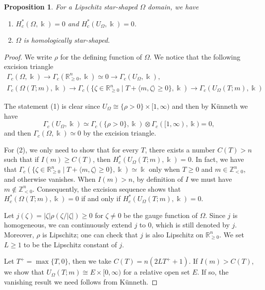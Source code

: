 \documentclass[11pt]{amsart}
\numberwithin{equation}{section}
\theoremstyle{plain}
\newtheorem{Prop}[prop]{Proposition}
\theoremstyle{definition}
\theoremstyle{remark}
\newcommand{\bZ} { {\mathbb{Z}}}
\newcommand{\bR} { {\mathbb{R}}}
\begin{document}
\begin{Prop}\label{proposition: regularity for lipschitz star-shaped domain}For a Lipschitz star-shaped $\Omega$ domain, we have
\begin{enumerate}
    \item $H_c^*(\Omega,\Bbbk)=0$ and $H_c^*(U_\Omega,\Bbbk)=0$.
    \item $\Omega$ is homologically star-shaped.
\end{enumerate}    
\end{Prop}
\begin{proof}We write $\rho$ for the defining function of $\Omega$. 
We notice that the following excision triangle
\begin{gather*}
    \Gamma_c(\Omega,\Bbbk)\to \Gamma_c(\bR^n_{\geq0},\Bbbk)\simeq 0\to \Gamma_c(U_\Omega,\Bbbk),\\ \Gamma_c(\Omega(T;m),\Bbbk)\to \Gamma_c(\{\zeta\in\bR^n_{\geq0} \mid T+\langle m,\zeta\rangle\geq 0\},\Bbbk)\to \Gamma_c(U_\Omega(T;m),\Bbbk)
\end{gather*}

The statement (1) is clear since $U_\Omega\cong \{\rho>0\}\times [1,\infty)$ and then by Künneth we have \[\Gamma_c(U_\Omega,\Bbbk)\simeq \Gamma_c(\{\rho>0\},\Bbbk)\otimes \Gamma_c([1,\infty),\Bbbk)=0,\]
and then $\Gamma_c(\Omega,\Bbbk)\simeq 0$ by the excision triangle.



For (2), we only need to show that for every $T$, there exists a number $C(T)>n$ such that if $I(m)\geq C(T)$, then $H^*_c(U_\Omega(T;m),\Bbbk)=0$. In fact, we have that $\Gamma_c(\{\zeta\in\bR^n_{\geq0} \mid T+\langle m,\zeta\rangle\geq 0\},\Bbbk)\simeq \Bbbk$ only when $T\geq 0$ and $m\in \bZ^n_{<0}$, and otherwise vanishes. When $I(m)>n$, by definition of $I$ we must have $m\notin \bZ^n_{<0}$. Consequently, the excision sequence shows that $H^*_c(\Omega(T;m),\Bbbk)=0$ if and only if $H^*_c(U_\Omega(T;m),\Bbbk)=0$.

Let $j(\zeta)=|\zeta|\rho(\zeta/|\zeta|)\geq 0$ for $\zeta\neq 0$ be the gauge function of $\Omega$. Since $j$ is homogeneous, we can continuously extend $j$ to $0$, which is still denoted by $j$. Moreover, $\rho$ is Lipschitz; one can check that $j$ is also Lipschitz on $\bR^n_{\geq0} $. We set $L\geq 1$ to be the Lipschitz constant of $j$. 

Let $T^+=\max\{T,0\}$, then we take $C(T)=n(2LT^+ +1)$. If $I(m)>C(T)$, we show that $U_\Omega(T;m)\cong  E\times [0,\infty)$ for a relative open set $E$. If so, the vanishing result we need follows from Künneth.


\end{proof}
\end{document}
